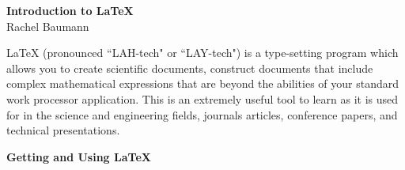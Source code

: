 \documentclass[11pt]{article}
\begin{document}
\begin{center}
{\Large \bf Introduction to LaTeX}\\ 
 {\large Rachel Baumann}
\end{center}

\vspace{0.5cm}

\noindent
LaTeX (pronounced ``LAH-tech" or ``LAY-tech") is a type-setting program which allows you to create scientific documents, construct documents that include complex mathematical expressions that are beyond the abilities of your standard work processor application. This is an extremely useful tool to learn as it is used for in the science and engineering fields, journals articles, conference papers, and technical presentations.\\

\vspace{0.5cm}

{\Large\textbf{Getting and Using LaTeX} }
\end{document}
